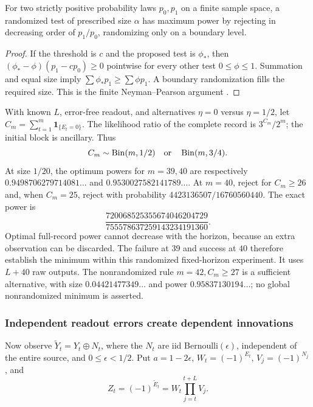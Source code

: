 \begin{lemma}\label{op:np}
For two strictly positive probability laws \(p_0,p_1\) on a finite
sample space, a randomized test of prescribed size \(\alpha\) has maximum
power by rejecting in decreasing order of \(p_1/p_0\), randomizing only
on a boundary level.
\end{lemma}
\begin{proof}
If the threshold is \(c\) and the proposed test is \(\phi_*\), then
\((\phi_*-\phi)(p_1-cp_0)\ge0\) pointwise for every other test
\(0\le\phi\le1\).  Summation and equal size imply
\(\sum\phi_*p_1\ge\sum\phi p_1\).  A boundary randomization fills the
required size.  This is the finite Neyman--Pearson argument
\cite{op:neyman}.
\end{proof}

With known \(L\), error-free readout, and alternatives \(\eta=0\) versus
\(\eta=1/2\), let \(C_m=\sum_{t=1}^m\mathbf1_{\{E_t=0\}}\).
The likelihood ratio of the complete record is \(3^{C_m}/2^m\);
the initial block is ancillary.  Thus
\[
 C_m\sim\operatorname{Bin}(m,1/2)\quad\hbox{or}\quad
 \operatorname{Bin}(m,3/4).
\]
At size \(1/20\), the optimum powers for \(m=39,40\) are respectively
\(0.9498706279714081\ldots\) and \(0.9530027582141789\ldots\).
At \(m=40\), reject for \(C_m\ge26\) and, when \(C_m=25\), reject with
probability \(4423136507/16760560440\).
The exact power is
\[
 \frac{720068525355674046204729}{755578637259143234191360}.
\]
Optimal full-record power cannot decrease with the horizon, because an
extra observation can be discarded.  The failure at \(39\) and success
at \(40\) therefore establish the minimum within this randomized
fixed-horizon experiment.  It uses \(L+40\) raw outputs.  The nonrandomized
rule \(m=42,C_m\ge27\) is a sufficient alternative, with size
\(0.04421477349\ldots\) and power \(0.95837130194\ldots\); no global
nonrandomized minimum is asserted.

\subsubsection{Independent readout errors create dependent innovations}

Now observe \(\widetilde Y_t=Y_t\oplus N_t\), where the \(N_t\) are iid
Bernoulli\((\epsilon)\), independent of the entire source, and
\(0\le\epsilon<1/2\).  Put \(a=1-2\epsilon\),
\(W_t=(-1)^{E_t}\), \(V_j=(-1)^{N_j}\), and
\[
 Z_t=(-1)^{\widetilde E_t}
     =W_t\prod_{j=t}^{t+L}V_j.
\]

